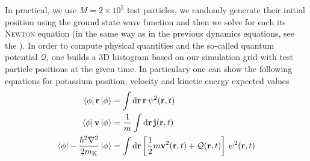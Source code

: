 In practical, we use $M=2\times 10^5$ test particles, we randomly generate their initial position using the ground state wave function and then we solve for each its \textsc{Newton} equation (in the same way as in the previous dynamics equations, see the ). In order to compute physical quantities and the so-called quantum potential $\mathcal{Q}$, one builds a 3D histogram based on our simulation grid with test particle positions at the given time. In particulary one can show \cite{DFTguide} the following equations for potassium position, velocity and kinetic energy expected values
\begin{align}
\bra{\phi}\vb{r}\ket{\phi}&= \int \dd{\vb{r}} \vb{r} \, \psi^2(\vb{r},t)\\
\bra{\phi}\vb{v}\ket{\phi} &= \frac{1}{m} \int \dd{\vb{r}} \vb{j}(\vb{r},t)\\
\bra{\phi}-\frac{\hbar^2 \vb{\nabla}^2}{2m_{\mathrm{K}}} \ket{\phi} &=\int \dd{\vb{r}} \left[\frac{1}{2}m\vb{v}^2(\vb{r},t) + \mathcal{Q}(\vb{r},t) \right] \, \psi^2(\vb{r},t)
\end{align}
